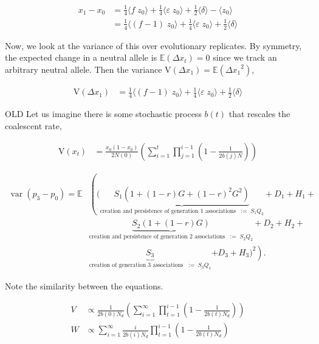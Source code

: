 \documentclass[11pt]{article}
\newcommand{\E}{\mathbb{E}}
\newcommand{\V}{\text{V}}
\DeclareMathOperator{\var}{var}
\begin{document}

\begin{align}
  x_1 - x_0 &= \frac{1}{4} \langle f \; z_{0} \rangle + \frac{1}{4} \langle \varepsilon \; z_{0} \rangle + \frac{1}{2}\langle \delta \rangle - \langle z_0 \rangle \\
            &= \frac{1}{4} \langle (f-1) \; z_{0} \rangle + \frac{1}{4} \langle \varepsilon \; z_{0} \rangle + \frac{1}{2}\langle \delta \rangle 
\end{align}

Now, we look at the variance of this over evolutionary replicates. By symmetry,
the expected change in a neutral allele is $\E(\Delta x_t) = 0$ since we track
an arbitrary neutral allele. Then the variance $\V(\Delta x_1) = \E( {\Delta
x_1}^2)$,

\begin{align}
  \V(\Delta x_1) &= \frac{1}{4} \langle (f-1) \; z_{0} \rangle + \frac{1}{4} \langle \varepsilon \; z_{0} \rangle + \frac{1}{2}\langle \delta \rangle 
\end{align}


OLD
Let us imagine there is some stochastic process $b(t)$ that rescales the coalescent
rate, 

\begin{align}
  \V(x_t) &= \frac{x_0(1-x_0)}{2N(0)}\left(\sum_{i=1}^t \prod_{j=1}^{i-1} \left(1 - \frac{1}{2b(j)N}\right) \right)
\end{align}



\begin{align}
  \var(p_3 - p_0) = \E & \left( \bigg( \underbrace{S_1(1 + (1-r) G + (1-r)^2 G^2)}_{\text{creation and persistence of generation 1 associations} \;\; := \; S_1 Q_3} \right. +  D_1 + H_1+ \nonumber \\
                       & \underbrace{S_2(1 + (1-r) G)}_{\text{creation and persistence of generation 2 associations} \;\; := \; S_2 Q_2}+ D_2 + H_2 + \nonumber \\
                       &  \underbrace{S_3}_{\text{creation of generation 3 associations} \;\; := \; S_3 Q_1  }\left. + D_3 + H_3 \bigg)^2 \right). &
    \label{eq:scr-var2}
\end{align}
%

Note the similarity between the equations.

\begin{align}
  V &\propto \frac{1}{2b(0)N_d}\left(\sum_{i=1}^\infty \prod_{t=1}^{i-1} \left(1 - \frac{1}{2b(t)N_d}\right) \right) \\
  W &\propto \sum_{i=1}^\infty \frac{i}{2 b(i) N_d} \prod_{t=1}^{i-1} \left(1-\frac{1}{2 b(t) N_d}\right) \\
\end{align}
\end{document}
